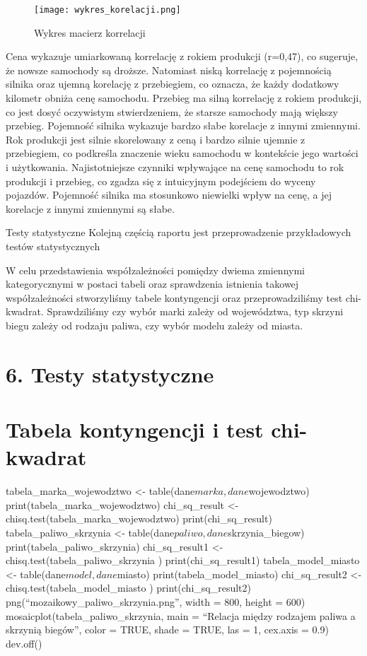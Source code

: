 \documentclass[
]{article}
\begin{document}
\begin{figure}
\centering
\texttt{[image: wykres\_korelacji.png]}
\caption{Wykres macierz korrelacji}
\end{figure}

Cena wykazuje umiarkowaną korrelację z rokiem produkcji (r=0,47), co
sugeruje, że nowsze samochody są droższe. Natomiast niską korrelację z
pojemnością silnika oraz ujemną korelację z przebiegiem, co oznacza, że
każdy dodatkowy kilometr obniża cenę samochodu. Przebieg ma silną
korrelację z rokiem produkcji, co jest dosyć oczywistym stwierdzeniem,
że starsze samochody mają większy przebieg. Pojemność silnika wykazuje
bardzo słabe korelacje z innymi zmiennymi. Rok produkcji jest silnie
skorelowany z ceną i bardzo silnie ujemnie z przebiegiem, co podkreśla
znaczenie wieku samochodu w kontekście jego wartości i użytkowania.
Najistotniejsze czynniki wpływające na cenę samochodu to rok produkcji i
przebieg, co zgadza się z intuicyjnym podejściem do wyceny pojazdów.
Pojemność silnika ma stosunkowo niewielki wpływ na cenę, a jej korelacje
z innymi zmiennymi są słabe.

Testy statystyczne Kolejną częścią raportu jest przeprowadzenie
przykładowych testów statystycznych

W celu przedstawienia współzależności pomiędzy dwiema zmiennymi
kategorycznymi w postaci tabeli oraz sprawdzenia istnienia takowej
współzależności stworzyliśmy tabele kontyngencji oraz przeprowadziliśmy
test chi-kwadrat. Sprawdziliśmy czy wybór marki zależy od województwa,
typ skrzyni biegu zależy od rodzaju paliwa, czy wybór modelu zależy od
miasta.

\section{6. Testy statystyczne}\label{testy-statystyczne}

\section{Tabela kontyngencji i test
chi-kwadrat}\label{tabela-kontyngencji-i-test-chi-kwadrat}

tabela\_marka\_wojewodztwo \textless-
table(dane\(marka, dane\)wojewodztwo) print(tabela\_marka\_wojewodztwo)
chi\_sq\_result \textless- chisq.test(tabela\_marka\_wojewodztwo)
print(chi\_sq\_result) tabela\_paliwo\_skrzynia \textless-
table(dane\(paliwo, dane\)skrzynia\_biegow)
print(tabela\_paliwo\_skrzynia) chi\_sq\_result1 \textless-
chisq.test(tabela\_paliwo\_skrzynia ) print(chi\_sq\_result1)
tabela\_model\_miasto \textless- table(dane\(model, dane\)miasto)
print(tabela\_model\_miasto) chi\_sq\_result2 \textless-
chisq.test(tabela\_model\_miasto ) print(chi\_sq\_result2)
png(``mozaikowy\_paliwo\_skrzynia.png'', width = 800, height = 600)
mosaicplot(tabela\_paliwo\_skrzynia, main = ``Relacja między rodzajem
paliwa a skrzynią biegów'', color = TRUE, shade = TRUE, las = 1,
cex.axis = 0.9) dev.off()
\end{document}
